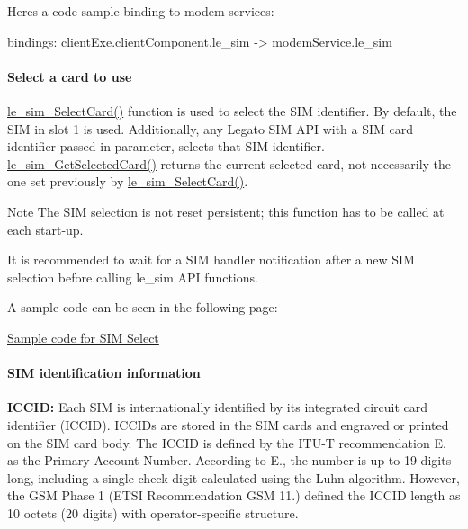 Here\textquotesingle{}s a code sample binding to modem services\+: \begin{DoxyVerb}bindings:
{
   clientExe.clientComponent.le_sim -> modemService.le_sim
}
\end{DoxyVerb}
\hypertarget{c_sim_le_sim_SelectCard}{}\paragraph{Select a card to use}\label{c_sim_le_sim_SelectCard}
\hyperlink{le__sim__interface_8h_a91a0f0399c89e466b9a8ccfab6de129d}{le\+\_\+sim\+\_\+\+Select\+Card()} function is used to select the S\+IM identifier. By default, the S\+IM in slot 1 is used. Additionally, any Legato S\+IM A\+PI with a S\+IM card identifier passed in parameter, selects that S\+IM identifier. \hyperlink{le__sim__interface_8h_a4c9e3ded0485f14c66e4d51763f2de57}{le\+\_\+sim\+\_\+\+Get\+Selected\+Card()} returns the current selected card, not necessarily the one set previously by \hyperlink{le__sim__interface_8h_a91a0f0399c89e466b9a8ccfab6de129d}{le\+\_\+sim\+\_\+\+Select\+Card()}.

\begin{DoxyNote}{Note}
The S\+IM selection is not reset persistent; this function has to be called at each start-\/up.

It is recommended to wait for a S\+IM handler notification after a new S\+IM selection before calling le\+\_\+sim A\+PI functions.
\end{DoxyNote}
A sample code can be seen in the following page\+:
\begin{DoxyItemize}
\item \hyperlink{c_simTestSelect}{Sample code for S\+IM Select}
\end{DoxyItemize}\hypertarget{c_sim_le_sim_id}{}\paragraph{S\+I\+M identification information}\label{c_sim_le_sim_id}
{\bfseries I\+C\+C\+ID\+:} Each S\+IM is internationally identified by its integrated circuit card identifier (I\+C\+C\+ID). I\+C\+C\+I\+Ds are stored in the S\+IM cards and engraved or printed on the S\+IM card body. The I\+C\+C\+ID is defined by the I\+T\+U-\/T recommendation E. as the Primary Account Number. According to E., the number is up to 19 digits long, including a single check digit calculated using the Luhn algorithm. However, the G\+SM Phase 1 (E\+T\+SI Recommendation G\+SM 11.) defined the I\+C\+C\+ID length as 10 octets (20 digits) with operator-\/specific structure.

